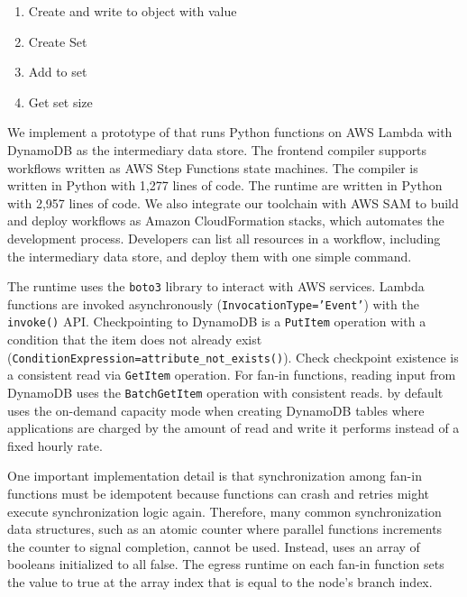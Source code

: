 \begin{enumerate}
  \item Create and write to object with value
  \item Create Set
  \item Add to set
  \item Get set size
\end{enumerate}


We implement a prototype of \name{} that runs Python functions on AWS Lambda
with DynamoDB as the intermediary data store. The frontend compiler
supports workflows written as AWS Step Functions state machines. The compiler
is written in Python with 1,277 lines of code.
The runtime are written in Python with 2,957 lines of code. We also integrate
our toolchain with AWS SAM to build and deploy \name{} workflows as Amazon
CloudFormation stacks, which automates the development process. Developers can
list all resources in a workflow, including the intermediary data store, and
deploy them with one simple command.

The runtime uses the \texttt{boto3} library to interact with AWS services.
Lambda functions are invoked asynchronously (\texttt{InvocationType='Event'})
with the \texttt{invoke()} API. Checkpointing to DynamoDB is a
\texttt{PutItem} operation with a condition that the item does not already
exist (\texttt{ConditionExpression=attribute\_not\_exists()}). Check
checkpoint existence is a consistent read via \texttt{GetItem} operation. For
fan-in functions, reading input from DynamoDB uses the \texttt{BatchGetItem}
operation with consistent reads.
\name{} by default uses the on-demand capacity mode when creating DynamoDB
tables where applications are charged by the amount of read and write it
performs instead of a fixed hourly rate.

One important implementation detail is that synchronization among fan-in
functions must be idempotent because functions can crash and retries might
execute synchronization logic again. Therefore, many common synchronization
data structures, such as an atomic counter where parallel functions increments
the counter to signal completion, cannot be used. Instead, \name{} uses an
array of booleans initialized to all false. The egress runtime on each fan-in
function sets the value to true at the array index that is equal to the node's
branch index.
